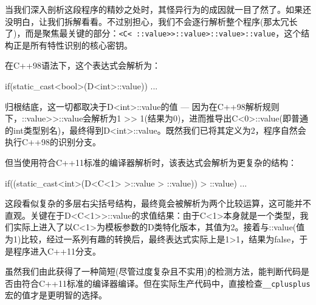 当我们深入剖析这段程序的精妙之处时，其怪异行为的成因就一目了然了。如果还没明白，让我们拆解看看。不过别担心，我们不会逐行解析整个程序(那太冗长了)，而是聚焦最关键的部分：\verb|<C< ::value>>::value>::value>::value|，这个结构正是所有特性识别的核心密钥。

在C++98语法下，这个表达式会解析为：

\begin{cpp}
if(static_cast<bool>(D<int>::value)) { ... }
\end{cpp}

归根结底，这一切都取决于D<int>::value的值 --- 因为在C++98解析规则下，::value>{}>::value会解析为1 >{}> 1(结果为0)，进而推导出C<0>::value(即普通的int类型别名)，最终得到D<int>::value。既然我们已将其定义为2，程序自然会执行C++98的识别分支。

但当使用符合C++11标准的编译器解析时，该表达式会解析为更复杂的结构：

\begin{cpp}
if((static_cast<int>(D<C<1> >::value > ::value)) > ::value) { ... }
\end{cpp}

这段看似复杂的多层右尖括号结构，最终竟会被解析为两个比较运算，这可能并不直观。关键在于D<C<1>{}>::value的求值结果：由于C<1>本身就是一个类型，我们实际上进入了以C<1>为模板参数的D类特化版本，其值为2。接着与::value(值为1)比较，经过一系列有趣的转换后，最终表达式实际上是1>1，结果为false，于是程序进入C++11分支。

虽然我们由此获得了一种简短(尽管过度复杂且不实用)的检测方法，能判断代码是否由符合C++11标准的编译器编译。但在实际生产代码中，直接检查\verb|__cplusplus|宏的值才是更明智的选择。






